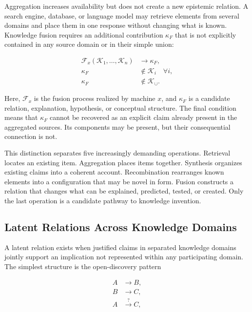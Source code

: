 Aggregation increases availability but does not create a new epistemic
relation. A search engine, database, or language model may retrieve elements
from several domains and place them in one response without changing what is
known. Knowledge fusion requires an additional contribution $\kappa_F$ that is
not explicitly contained in any source domain or in their simple union:

\begin{equation}
\begin{aligned}
\mathcal{F}_{x}
(\mathcal{K}_{1},\ldots,\mathcal{K}_{n})
&\longrightarrow \kappa_F,\\
\kappa_F
&\notin \mathcal{K}_{i}
\quad \forall i,\\
\kappa_F
&\notin \mathcal{K}_{\cup}.
\end{aligned}
\label{eq:fusion_novel_relation}
\end{equation}

Here, $\mathcal{F}_{x}$ is the fusion process realized by machine $x$, and
$\kappa_F$ is a candidate relation, explanation, hypothesis, or conceptual
structure. The final condition means that $\kappa_F$ cannot be recovered as an
explicit claim already present in the aggregated sources. Its components may
be present, but their consequential connection is not.

This distinction separates five increasingly demanding operations. Retrieval
locates an existing item. Aggregation places items together. Synthesis organizes
existing claims into a coherent account. Recombination rearranges known
elements into a configuration that may be novel in form. Fusion constructs a
relation that changes what can be explained, predicted, tested, or created.
Only the last operation is a candidate pathway to knowledge invention.

\subsection{\textbf{Latent Relations Across Knowledge Domains}}

A latent relation exists when justified claims in separated knowledge domains
jointly support an implication not represented within any participating
domain. The simplest structure is the open-discovery pattern

\begin{equation}
\begin{aligned}
A &\longrightarrow B,\\
B &\longrightarrow C,\\
A &\overset{?}{\longrightarrow} C,
\end{aligned}
\label{eq:abc_fusion}
\end{equation}

